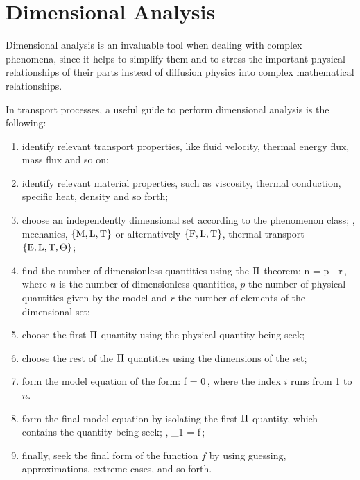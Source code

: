 \section{Dimensional Analysis}
%
Dimensional analysis is an invaluable tool when dealing with complex phenomena, since it helps to simplify them and to stress the important physical relationships of their parts instead of diffusion physics into complex mathematical relationships. 

In transport processes, a useful guide to perform dimensional analysis is the following:
\begin{enumerate}
\item identify relevant transport properties, like fluid velocity, thermal energy flux, mass flux and so on;
\item identify relevant material properties, such as viscosity, thermal conduction, specific heat, density and so forth;
\item choose an independently dimensional set according to the phenomenon class; \ie, mechanics, $\left\lbrace{\text{M}, \text{L}, \text{T}}\right\rbrace$ or alternatively $\left\lbrace{\text{F}, \text{L}, \text{T}}\right\rbrace$, thermal transport $\left\lbrace{\text{E}, \text{L}, \text{T}, \Theta}\right\rbrace$;
\item find the number of dimensionless quantities using the $\Pi$-theorem:
\beq
n = p - r\,,
\eeq
where $n$ is the number of dimensionless quantities, $p$ the number of physical quantities given by the model and $r$ the number of elements of the dimensional set;
\item choose the first $\Pi$ quantity using the physical quantity being seek;
\item choose the rest of the $\Pi$ quantities using the dimensions of the set;
\item form the model equation of the form:
\beq
f = 0\,,
\eeq
where the index $i$ runs from 1 to $n$.
\item form the final model equation by isolating the first $\Pi$ quantity, which contains the quantity being seek; \ie,
\beq
\kdim_1 = f\,;
\eeq
\item finally, seek the final form of the function $f$ by using guessing, approximations, extreme cases, and so forth.
\end{enumerate}

